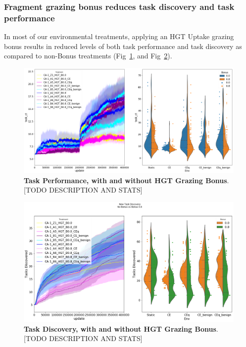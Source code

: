 \documentclass[PhD]{msu-thesis}
\begin{document}
\subsubsection{Fragment grazing bonus reduces task discovery and task performance}
In most of our environmental treatments, applying an HGT Uptake grazing bonus results in reduced levels of both task performance and task discovery as compared to non-Bonus treatments (Fig~\ref{fig:lte-hgt_task_performance}, and Fig~\ref{fig:lte-hgt_task_discovery}).

	\begin{figure}[!h]
	\includegraphics[trim={0 0 0 0}, clip, width=0.75\columnwidth]{figures/LTE/lte-hgt-task_performance.png}
	\caption{\textbf{Task Performance, with and without HGT Grazing Bonus}. [TODO DESCRIPTION AND STATS]%
	}
	\label{fig:lte-hgt_task_performance}
	\end{figure}

	\begin{figure}[!h]
	\includegraphics[trim={0 0 0 0}, clip, width=0.75\columnwidth]{figures/LTE/lte-hgt-task_discovery.png}
	\caption{\textbf{Task Discovery, with and without HGT Grazing Bonus}. [TODO DESCRIPTION AND STATS]%
	}
	\label{fig:lte-hgt_task_discovery}
	\end{figure}
\end{document}
